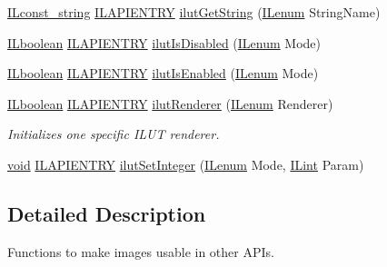 \begin{DoxyCompactItemize}
\item 
\hyperlink{group__il__types_ga1aa1edc3eb344e14acacb02bade24a5a}{I\+Lconst\+\_\+string} \hyperlink{_i_l_8h_a69c08a8d06df986f7e46f209d131ef2f}{I\+L\+A\+P\+I\+E\+N\+T\+R\+Y} \hyperlink{group___i_l_u_t_ga24c852fb6e63837c45159733609eacd5}{ilut\+Get\+String} (\hyperlink{group__il__types_ga62ca73445716183ef42b1f3906a45ed0}{I\+Lenum} String\+Name)
\item 
\hyperlink{group__il__types_gaa6aa7c95cfdc06b4d8601ef832b7bb0a}{I\+Lboolean} \hyperlink{_i_l_8h_a69c08a8d06df986f7e46f209d131ef2f}{I\+L\+A\+P\+I\+E\+N\+T\+R\+Y} \hyperlink{group___i_l_u_t_ga1fdbc5ffcc586105093c003011d7bd8b}{ilut\+Is\+Disabled} (\hyperlink{group__il__types_ga62ca73445716183ef42b1f3906a45ed0}{I\+Lenum} Mode)
\item 
\hyperlink{group__il__types_gaa6aa7c95cfdc06b4d8601ef832b7bb0a}{I\+Lboolean} \hyperlink{_i_l_8h_a69c08a8d06df986f7e46f209d131ef2f}{I\+L\+A\+P\+I\+E\+N\+T\+R\+Y} \hyperlink{group___i_l_u_t_gae148777db247440496fb0dc0710afcd6}{ilut\+Is\+Enabled} (\hyperlink{group__il__types_ga62ca73445716183ef42b1f3906a45ed0}{I\+Lenum} Mode)
\item 
\hyperlink{group__il__types_gaa6aa7c95cfdc06b4d8601ef832b7bb0a}{I\+Lboolean} \hyperlink{_i_l_8h_a69c08a8d06df986f7e46f209d131ef2f}{I\+L\+A\+P\+I\+E\+N\+T\+R\+Y} \hyperlink{group___i_l_u_t_ga7d62c8cba1fdb8a88451ff415f298865}{ilut\+Renderer} (\hyperlink{group__il__types_ga62ca73445716183ef42b1f3906a45ed0}{I\+Lenum} Renderer)
\begin{DoxyCompactList}\small\item\em Initializes one specific I\+L\+U\+T renderer. \end{DoxyCompactList}\item 
\hyperlink{_i_l_8h_a5530e04d947bcddd83639ea7940faf10}{void} \hyperlink{_i_l_8h_a69c08a8d06df986f7e46f209d131ef2f}{I\+L\+A\+P\+I\+E\+N\+T\+R\+Y} \hyperlink{group___i_l_u_t_ga9afaf81f759a4db0c181ecd28e73f3cb}{ilut\+Set\+Integer} (\hyperlink{group__il__types_ga62ca73445716183ef42b1f3906a45ed0}{I\+Lenum} Mode, \hyperlink{group__il__types_ga8effe51a00daaa0878631e5af75a36cb}{I\+Lint} Param)
\end{DoxyCompactItemize}


\subsection{Detailed Description}
Functions to make images usable in other A\+P\+Is. 




